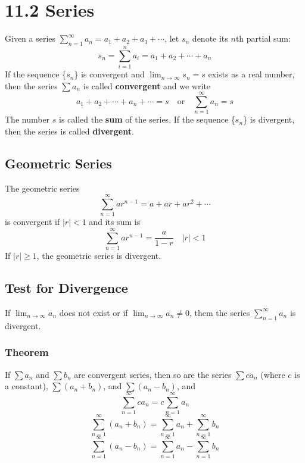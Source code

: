 %
%

\section*{11.2 Series}

Given a series \(\sum_{n=1}^{\infty}{a_n} = a_1 + a_2 + a_3 + \cdots\), let \(s_n\) denote its \(n\)th partial sum:
\[ s_n = \sum_{i=1}^n{a_i} = a_1 + a_2 + \cdots + a_n \]
If the sequence \{\(s_n\)\} is convergent and \(\lim_{n \to \infty}{s_n} = s\) exists as a real number, then the series \(\sum{a_n}\) is called \textbf{convergent} and we write
\[ a_1 + a_2 + \cdots + a_n + \cdots = s \quad \text{or} \quad \sum_{n=1}^{\infty}{a_n} = s \]
The number \(s\) is called the \textbf{sum} of the series. If the sequence \{\(s_n\)\} is divergent, then the series is called \textbf{divergent}.

\subsection*{Geometric Series}

The geometric series
\[ \sum_{n=1}^{\infty}{ar^{n-1}} = a + ar + ar^2 + \cdots \]
is convergent if \(|r| < 1\) and its sum is
\[ \sum_{n=1}^{\infty}{ar^{n-1}} = \frac{a}{1-r} \quad |r| < 1\]
If \(|r| \geq 1\), the geometric series is divergent.

\subsection*{Test for Divergence}

If \(\lim_{n \to \infty}{a_n}\) does not exist or if \( \lim_{n \to \infty}{a_n} \neq 0\), them the series \(\sum_{n=1}^{\infty}{a_n}\) is divergent.

\subsubsection*{Theorem}

If \(\sum{a_n}\) and \(\sum{b_n}\) are convergent series, then so are the series \(\sum{c a_n}\) (where \(c\) is a constant), \(\sum{(a_n + b_n)}\), and \(\sum{(a_n - b_n)}\), and
\[ \sum_{n=1}^{\infty}{c a_n} = c \sum_{n=1}^{\infty}{a_n} \]
\[ \sum_{n=1}^{\infty}{(a_n + b_n)} = \sum_{n=1}^{\infty}{a_n} + \sum_{n=1}^{\infty}{b_n} \]
\[ \sum_{n=1}^{\infty}{(a_n - b_n)} = \sum_{n=1}^{\infty}{a_n} - \sum_{n=1}^{\infty}{b_n} \]
